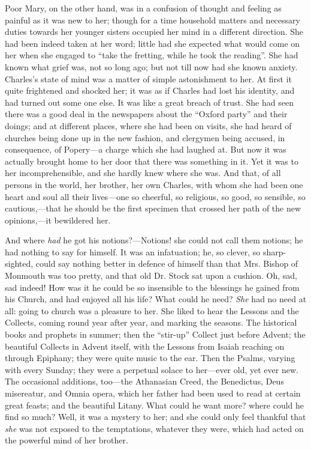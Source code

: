 Poor Mary, on the other hand, was in a confusion of thought and
feeling as painful as it was new to her; though for a time household
matters and necessary duties towards her younger sisters occupied her
mind in a different direction. She had been indeed taken at her word;
little had she expected what would come on her when she engaged to
``take the fretting, while he took the reading''. She had
known what grief was, not so long ago; but not till now had she known
anxiety. Charles's state of mind was a matter of simple astonishment
to her. At first it quite frightened and shocked her; it was as if
Charles had lost his identity, and had turned out some one else. It
was like a great breach of trust. She had seen there was a good deal
in the newspapers about the ``Oxford party'' and their doings;
and at different places, where she had been on visits, she had heard
of churches being done up in the new fashion, and clergymen being
accused, in consequence, of Popery—a charge which she had laughed
at. But now it was actually brought home to her door that there was
something in it. Yet it was to her incomprehensible, and she hardly
knew where she was. And that, of all persons in the world, her
brother, her own Charles, with whom she had been one heart and soul
all their lives—one so cheerful, so religious, so good, so sensible,
so cautious,—that he should be the first specimen that crossed her
path of the new opinions,—it bewildered her.

And where \emph{had} he got his notions?—Notions! she could not
call them notions; he had nothing to say for himself. It was an
infatuation; he, so clever, so sharp-sighted, could say nothing
better in defence of himself than that Mrs. Bishop of Monmouth was too
pretty, and that old Dr. Stock sat upon a cushion. Oh, sad, sad
indeed! How was it he could be so insensible to the blessings he
gained from his Church, and had enjoyed all his life? What could he
need? \emph{She} had no need at all: going to church was a pleasure to
her. She liked to hear the Lessons and the Collects, coming round year
after year, and marking the seasons. The historical books and prophets
in summer; then the ``stir-up'' Collect just before Advent;
the beautiful Collects in Advent itself, with the Lessons from Isaiah
reaching on through Epiphany; they were quite music to the ear. Then
the Psalms, varying with every Sunday; they were a perpetual solace to
her—ever old, yet ever new. The occasional additions, too—the
Athanasian Creed, the Benedictus, Deus misereatur, and Omnia opera,
which her father had been used to read at certain great feasts; and
the beautiful Litany. What could he want more? where could he find so
much? Well, it was a mystery to her; and she could only feel thankful
that \emph{she} was not exposed to the temptations, whatever they
were, which had acted on the powerful mind of her brother.

